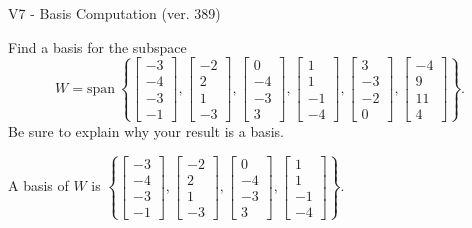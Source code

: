 \begin{exercise}
  \begin{exerciseTitle}V7 - Basis Computation (ver. 389)\end{exerciseTitle}
  \begin{exerciseStatement}
    Find a basis for the subspace 
\[W=\mathrm{span}\ \left\{\left[\begin{array}{r}
-3 \\
-4 \\
-3 \\
-1
\end{array}\right] , \left[\begin{array}{r}
-2 \\
2 \\
1 \\
-3
\end{array}\right] , \left[\begin{array}{r}
0 \\
-4 \\
-3 \\
3
\end{array}\right] , \left[\begin{array}{r}
1 \\
1 \\
-1 \\
-4
\end{array}\right] , \left[\begin{array}{r}
3 \\
-3 \\
-2 \\
0
\end{array}\right] , \left[\begin{array}{r}
-4 \\
9 \\
11 \\
4
\end{array}\right]\right\}.\]
 Be sure to explain why your result is a basis.


  \end{exerciseStatement}
  \begin{exerciseAnswer}
   A basis of \(W\) is  \(\left\{\left[\begin{array}{r}
-3 \\
-4 \\
-3 \\
-1
\end{array}\right] , \left[\begin{array}{r}
-2 \\
2 \\
1 \\
-3
\end{array}\right] , \left[\begin{array}{r}
0 \\
-4 \\
-3 \\
3
\end{array}\right] , \left[\begin{array}{r}
1 \\
1 \\
-1 \\
-4
\end{array}\right]\right\}\).
  


  \end{exerciseAnswer}
\end{exercise}